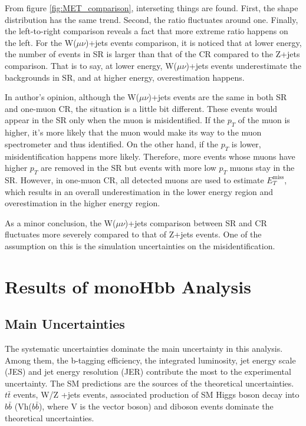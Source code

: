 \documentclass[class=NCU_thesis, crop=false]{standalone}
\begin{document}
		
		From figure \ref{fig:MET_comparison}, interseting things are found. First, the shape distribution has the same trend. Second, the ratio fluctuates around one. Finally, the left-to-right comparison reveals a fact that more extreme ratio happens on the left. For the W($\mu \nu$)+jets events comparison, it is noticed that at lower energy, the number of events in SR is larger than that of the CR compared to the Z+jets comparison. That is to say, at lower energy, W($\mu \nu$)+jets events underestimate the backgrounds in SR, and at higher energy, overestimation happens.
		
		In author's opinion, although the W($\mu \nu$)+jets events are the same in both SR and one-muon CR, the situation is a little bit different. These events would appear in the SR only when the muon is misidentified. If the $p_T$ of the muon is higher, it's more likely that the muon would make its way to the muon spectrometer and thus identified. On the other hand, if the $p_T$ is lower, misidentification happens more likely. Therefore, more events whose muons have higher $p_T$ are removed in the SR but events with more low $p_T$ muons stay in the SR. However, in one-muon CR, all detected muons are used to estimate $E_T^{\mathrm{miss}}$, which results in an overall underestimation in the lower energy region and overestimation in the higher energy region.
		
		As a minor conclusion, the W($\mu \nu$)+jets comparison between SR and CR fluctuates more severely compared to that of Z+jets events. One of the assumption on this is the simulation uncertainties on the misidentification.

\chapter{Results of monoHbb Analysis}

\section{Main Uncertainties}
	The systematic uncertainties dominate the main uncertainty in this analysis. Among them, the b-tagging efficiency, the integrated luminosity, jet energy scale (JES) and jet energy resolution (JER) contribute the most to the experimental uncertainty. The SM predictions are the sources of the theoretical uncertainties. $t\bar{t}$ events, W/Z +jets events, associated production of SM Higgs boson decay into $b\bar{b}$ (Vh($b\bar{b}$), where V is the vector boson) and diboson events dominate the theoretical uncertainties.
	
\end{document}
